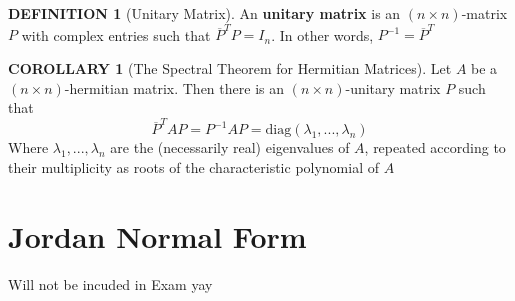 \documentclass[12pt]{article}
\theoremstyle{definition}
\newtheorem{definition}{DEFINITION}[subsection]
\newtheorem{corollary}{COROLLARY}[subsection]
\begin{document}
\begin{definition}[Unitary Matrix]
    An \textbf{unitary matrix} is an $(n \times n)$-matrix $P$ with complex entries such that $\overline{P}^TP = I_n$. In other words, $P^{-1} = \overline{P}^T$ 
\end{definition}

\begin{corollary}[The Spectral Theorem for Hermitian Matrices]
    Let $A$ be a $(n\times n)$-hermitian matrix. Then there is an $(n \times n)$-unitary matrix $P$ such that
    $$\overline{P}^TAP = P^{-1}AP = \text{diag}(\lambda_1,..., \lambda_n)$$
    Where $\lambda_1, ..., \lambda_n$ are the (necessarily real) eigenvalues of $A$, repeated according to their multiplicity as roots of the characteristic polynomial of $A$
\end{corollary}


\section{Jordan Normal Form}
Will not be incuded in  Exam yay

\end{document}
